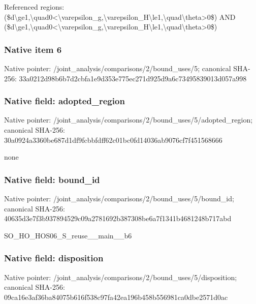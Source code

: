 \documentclass[10pt,a4paper]{article}
\begin{document}
\begingroup\raggedright\sloppy Referenced regions:\allowbreak{} (\$d\textbackslash{}ge1,\allowbreak{}\textbackslash{}quad0<\textbackslash{}varepsilon\_\allowbreak{}g,\allowbreak{}\textbackslash{}varepsilon\_\allowbreak{}H\textbackslash{}le1,\allowbreak{}\textbackslash{}quad\textbackslash{}theta>0\$) AND (\$d\textbackslash{}ge1,\allowbreak{}\textbackslash{}quad0<\textbackslash{}varepsilon\_\allowbreak{}g,\allowbreak{}\textbackslash{}varepsilon\_\allowbreak{}H\textbackslash{}le1,\allowbreak{}\textbackslash{}quad\textbackslash{}theta>0\$)\par\endgroup

\subsubsection{Native item 6}
Native pointer: /joint\_\allowbreak{}analysis/comparisons/2/bound\_\allowbreak{}uses/5; canonical SHA-256: 33a0212d98b6b7d2cbfa1e9d353e775ec271d925d9a6c73495839013d057a998

\subsubsection{Native field: adopted\_\allowbreak{}region}
Native pointer: /joint\_\allowbreak{}analysis/comparisons/2/bound\_\allowbreak{}uses/5/adopted\_\allowbreak{}region; canonical SHA-256: 30a0924a3360be687d1df9fcbbfdff62c01bc0fd14036ab9076cf7f451568666

\begingroup\raggedright\sloppy none\par\endgroup

\subsubsection{Native field: bound\_\allowbreak{}id}
Native pointer: /joint\_\allowbreak{}analysis/comparisons/2/bound\_\allowbreak{}uses/5/bound\_\allowbreak{}id; canonical SHA-256: 40635d3e7f3b937894529c09a2781692b387308be6a7f1341b4681248b717abd

\begingroup\raggedright\sloppy SO\_\allowbreak{}HO\_\allowbreak{}HOS06\_\allowbreak{}S\_\allowbreak{}reuse\_\allowbreak{}\_\allowbreak{}main\_\allowbreak{}\_\allowbreak{}b6\par\endgroup

\subsubsection{Native field: disposition}
Native pointer: /joint\_\allowbreak{}analysis/comparisons/2/bound\_\allowbreak{}uses/5/disposition; canonical SHA-256: 09ca16e3af36ba84075b616f538c97fa42ea196b458b556981ca0dbe2571d0ac
\end{document}
